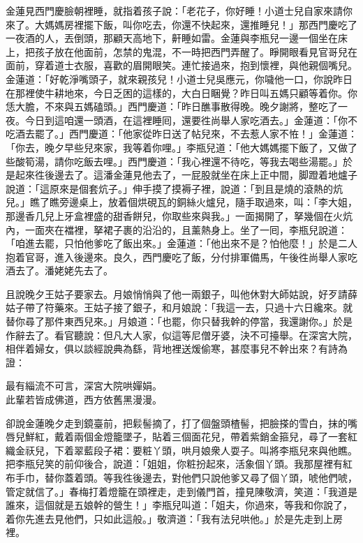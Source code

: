 金蓮見西門慶臉朝裡睡，就指着孩子說：「老花子，你好睡！小道士兒自家來請你來了。大媽媽房裡擺下飯，叫你吃去，你還不快起來，還推睡兒！」那西門慶吃了一夜酒的人，丟倒頭，那顧天高地下，鼾睡如雷。金蓮與李瓶兒一邊一個坐在床上，把孩子放在他面前，怎禁的鬼混，不一時把西門弄醒了。睜開眼看見官哥兒在面前，穿着道士衣服，喜歡的眉開眼笑。連忙接過來，抱到懷裡，與他親個嘴兒。金蓮道：「好乾淨嘴頭子，就來親孩兒！小道士兒吳應元，你噦他一口，你說昨日在那裡使牛耕地來，今日乏困的這樣的，大白日睏覺？昨日叫五媽只顧等着你。你恁大膽，不來與五媽磕頭。」{}西門慶道：「昨日醮事散得晚。晚夕謝將，整吃了一夜。今日到這咱還一頭酒，在這裡睡囘，還要徃尚舉人家吃酒去。」金蓮道：「你不吃酒去罷了。」西門慶道：「他家從昨日送了帖兒來，不去惹人家不恠！」金蓮道：「你去，晚夕早些兒來家，我等着你哩。」李瓶兒道：「他大媽媽擺下飯了，又做了些酸筍湯，請你吃飯去哩。」西門慶道：「我心裡還不待吃，等我去喝些湯罷。」於是起來徃後邊去了。這潘金蓮見他去了，一屁股就坐在床上正中間，脚蹬着地爐子說道：「這原來是個套炕子。」伸手摸了摸褥子裡，說道：「到且是燒的滾熱的炕兒。」瞧了瞧旁邊桌上，放着個烘硯瓦的銅絲火爐兒，隨手取過來，叫：「李大姐，那邊香几兒上牙盒裡盛的甜香餅兒，你取些來與我。」一面揭開了，拏幾個在火炕內，一面夾在襠裡，拏裙子裹的沿沿的，且薰熱身上。坐了一囘，李瓶兒說道：「咱進去罷，只怕他爹吃了飯出來。」金蓮道：「他出來不是？怕他麼！」於是二人抱着官哥，進入後邊來。良久，西門慶吃了飯，分付排軍備馬，午後徃尚舉人家吃酒去了。潘姥姥先去了。

且說晚夕王姑子要家去。月娘悄悄與了他一兩銀子，叫他休對大師姑說，好歹請薛姑子帶了符藥來。王姑子接了銀子，和月娘說：「我這一去，只過十六日纔來。就替你尋了那件東西兒來。」月娘道：「也罷，你只替我幹的停當，我還謝你。」於是作辭去了。看官聽說：但凡大人家，似這等尼僧牙婆，決不可擡舉。在深宮大院，相伴着婦女，俱以談經說典為繇，背地裡送煖偷寒，甚麼事兒不幹出來？有詩為證：

\begin{myquote}
最有緇流不可言，深宮大院哄嬋娟。\\此輩若皆成佛道，西方依舊黑漫漫。
\end{myquote}

卻說金蓮晚夕走到鏡臺前，把鬏髻摘了，打了個盤頭楂髻，把臉搽的雪白，抹的嘴唇兒鮮紅，戴着兩個金燈籠墜子，貼着三個面花兒，帶着紫銷金箍兒，尋了一套紅織金祆兒，下着翠藍段子裙：要粧丫頭，哄月娘衆人耍子。叫將李瓶兒來與他瞧。把李瓶兒笑的前仰後合，說道：「姐姐，你粧扮起來，活象個丫頭。我那屋裡有紅布手巾，替你蓋着頭。等我徃後邊去，對他們只說他爹又尋了個丫頭，唬他們唬，{}管定就信了。」春梅打着燈籠在頭裡走，走到儀門首，撞見陳敬濟，笑道：「我道是誰來，這個就是五娘幹的營生！」李瓶兒叫道：「姐夫，你過來，等我和你說了，着你先進去見他們，只如此這般。」敬濟道：「我有法兒哄他。」於是先走到上房裡。

